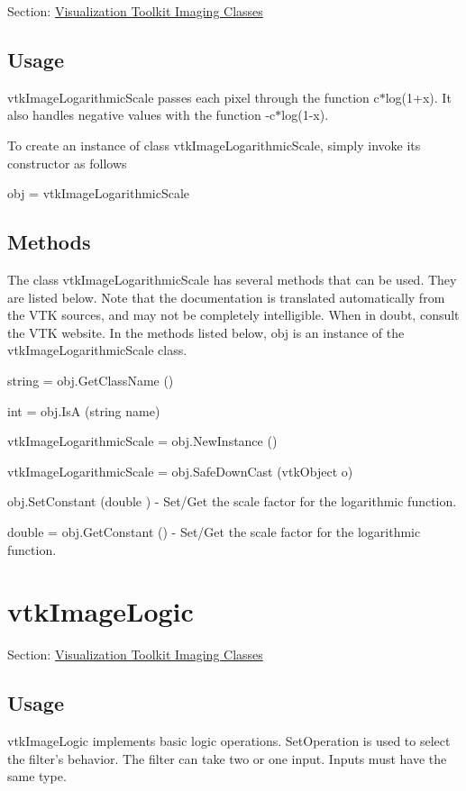 Section\-: \hyperlink{sec_vtkimaging}{Visualization Toolkit Imaging Classes} \hypertarget{vtkwidgets_vtkxyplotwidget_Usage}{}\subsection{Usage}\label{vtkwidgets_vtkxyplotwidget_Usage}
vtk\-Image\-Logarithmic\-Scale passes each pixel through the function c$\ast$log(1+x). It also handles negative values with the function -\/c$\ast$log(1-\/x).

To create an instance of class vtk\-Image\-Logarithmic\-Scale, simply invoke its constructor as follows \begin{DoxyVerb}  obj = vtkImageLogarithmicScale
\end{DoxyVerb}
 \hypertarget{vtkwidgets_vtkxyplotwidget_Methods}{}\subsection{Methods}\label{vtkwidgets_vtkxyplotwidget_Methods}
The class vtk\-Image\-Logarithmic\-Scale has several methods that can be used. They are listed below. Note that the documentation is translated automatically from the V\-T\-K sources, and may not be completely intelligible. When in doubt, consult the V\-T\-K website. In the methods listed below, {\ttfamily obj} is an instance of the vtk\-Image\-Logarithmic\-Scale class. 
\begin{DoxyItemize}
\item {\ttfamily string = obj.\-Get\-Class\-Name ()}  
\item {\ttfamily int = obj.\-Is\-A (string name)}  
\item {\ttfamily vtk\-Image\-Logarithmic\-Scale = obj.\-New\-Instance ()}  
\item {\ttfamily vtk\-Image\-Logarithmic\-Scale = obj.\-Safe\-Down\-Cast (vtk\-Object o)}  
\item {\ttfamily obj.\-Set\-Constant (double )} -\/ Set/\-Get the scale factor for the logarithmic function.  
\item {\ttfamily double = obj.\-Get\-Constant ()} -\/ Set/\-Get the scale factor for the logarithmic function.  
\end{DoxyItemize}\hypertarget{vtkimaging_vtkimagelogic}{}\section{vtk\-Image\-Logic}\label{vtkimaging_vtkimagelogic}
Section\-: \hyperlink{sec_vtkimaging}{Visualization Toolkit Imaging Classes} \hypertarget{vtkwidgets_vtkxyplotwidget_Usage}{}\subsection{Usage}\label{vtkwidgets_vtkxyplotwidget_Usage}
vtk\-Image\-Logic implements basic logic operations. Set\-Operation is used to select the filter's behavior. The filter can take two or one input. Inputs must have the same type.

